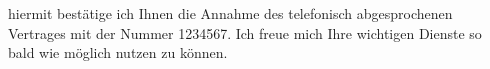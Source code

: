 \documentclass[
	a4paper,
	oneside,
	12pt
]{g-brief}
\begin{document}
\begin{g-brief}
hiermit bestätige ich Ihnen die Annahme des telefonisch abgesprochenen Vertrages mit der Nummer 1234567. Ich freue mich Ihre wichtigen Dienste so bald wie möglich nutzen zu können.
\end{g-brief}
\end{document}
